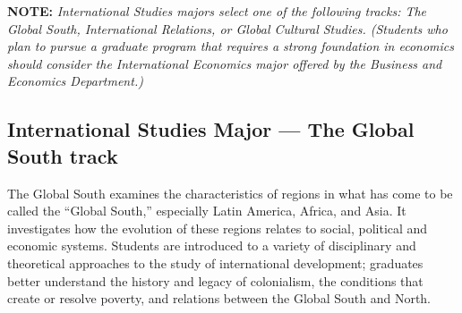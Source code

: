 \documentclass[
  letterpaper,
]{scrbook}
\begin{document}
\textbf{NOTE:} \emph{International Studies majors select one of the
following tracks: The Global South, International Relations, or Global
Cultural Studies. (Students who plan to pursue a graduate program that
requires a strong foundation in economics should consider the
International Economics major offered by the Business and Economics
Department.)}

\subsection{International Studies Major --- The Global South
track}\label{international-studies-major-the-global-south-track}

The Global South examines the characteristics of regions in what has
come to be called the ``Global South,'' especially Latin America,
Africa, and Asia. It investigates how the evolution of these regions
relates to social, political and economic systems. Students are
introduced to a variety of disciplinary and theoretical approaches to
the study of international development; graduates better understand the
history and legacy of colonialism, the conditions that create or resolve
poverty, and relations between the Global South and North.
\end{document}
